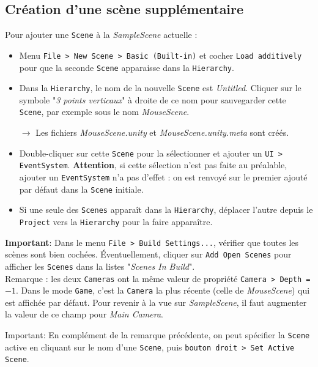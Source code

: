 \documentclass[a4paper,10pt]{article}
\newenvironment{solution}%
{\begin{tcolorbox}[breakable,colback=red!5!white,colframe=red!75!black,title=Solution]}%
{\end{tcolorbox}}
\begin{document}
\ifversionenseignant
\begin{solution}
\subsection{Création d'une scène supplémentaire}
	
Pour ajouter une \texttt{Scene} à la \textit{SampleScene} actuelle :
\begin{itemize}
	\item Menu \texttt{File > New Scene > Basic (Built-in)} et cocher \texttt{Load additively} pour que la seconde \texttt{Scene} apparaisse dans la \texttt{Hierarchy}.
	\item Dans la \texttt{Hierarchy}, le nom de la nouvelle \texttt{Scene} est \textit{Untitled}. Cliquer sur le symbole "\textit{3 points verticaux}" à droite de ce nom pour sauvegarder cette \texttt{Scene}, par exemple sous le nom \textit{MouseScene}.
	\item[$\rightarrow$] Les fichiers \textit{MouseScene.unity} et \textit{MouseScene.unity.meta} sont créés.
	\item Double-cliquer sur cette \texttt{Scene} pour la sélectionner et ajouter un \texttt{UI > EventSystem}. \textbf{Attention}, si cette sélection n'est pas faite au préalable, ajouter un \texttt{EventSystem} n'a pas d'effet : on est renvoyé sur le premier ajouté par défaut dans la \texttt{Scene} initiale.
	\item Si une seule des \texttt{Scenes} apparaît dans la \texttt{Hierarchy}, déplacer l'autre depuis le \texttt{Project} vers la \texttt{Hierarchy} pour la faire apparaître.
\end{itemize}	
		
\textbf{Important}: Dans le menu \texttt{File > Build Settings...}, vérifier que toutes les scènes sont bien cochées. Éventuellement, cliquer sur \texttt{Add Open Scenes} pour afficher les \texttt{Scenes} dans la listes "\textit{Scenes In Build}".\\

Remarque : les deux \texttt{Cameras} ont la même valeur de propriété \texttt{Camera > Depth = $-1$}. Dans le mode \texttt{Game}, c'est la \texttt{Camera} la plus récente (celle de \textit{MouseScene}) qui est affichée par défaut. Pour revenir à la vue sur \textit{SampleScene}, il faut augmenter la valeur de ce champ pour \textit{Main Camera}.

Important: En complément de la remarque précédente, on peut spécifier la \texttt{Scene} active en cliquant sur le nom d'une \texttt{Scene}, puis \texttt{bouton droit > Set Active Scene}.


\end{solution}
\end{document}
